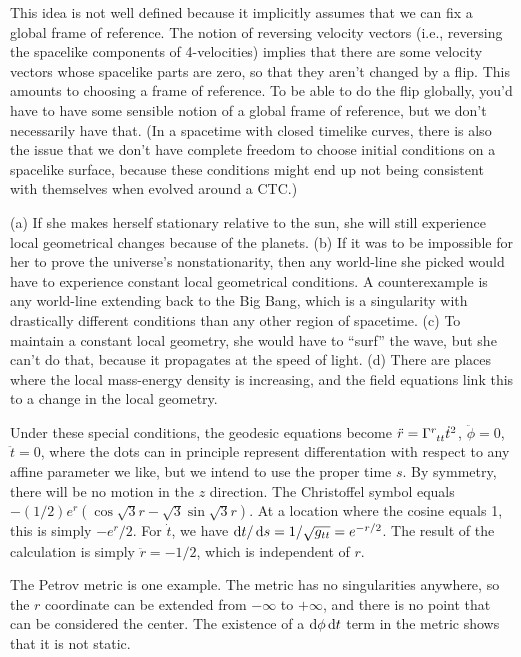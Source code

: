 This idea is not well defined because it implicitly assumes that we can fix a global
frame of reference. The notion of reversing velocity
vectors (i.e., reversing the spacelike components of 4-velocities) implies
that there are some velocity vectors whose spacelike parts are zero, so that
they aren't changed by a flip. This amounts to choosing a frame of reference. To
be able to do the flip globally, you'd have to have some sensible notion of
a global frame of reference, but we don't necessarily have that. (In a spacetime with closed timelike
curves, there is also the issue that we don't have complete freedom to choose initial
conditions on a spacelike surface, because these conditions might end up not being
consistent with themselves when evolved around a CTC.)


(a) If she makes herself stationary relative to the sun, she will still experience local geometrical changes
because of the planets. (b) If it was to be impossible for her to prove the universe's nonstationarity,
then any world-line she picked would have to experience constant local geometrical conditions.
A counterexample is any world-line extending back to the Big Bang, which is a singularity with drastically
different conditions than any other region of spacetime.
(c) To maintain a constant local geometry, she would have to ``surf'' the wave, but
she can't do that, because it propagates at the speed of light. (d) There are places where the
local mass-energy density is increasing, and the field equations link this to a change in the local
geometry.


Under these special conditions, the geodesic equations become $\ddot{r}=\Gamma\indices{^r_{tt}}\dot{t}^2$,
$\ddot{\phi}=0$, $\ddot{t}=0$,
where the dots can in principle represent differentation with respect to any affine parameter we like, but
we intend to use the proper time $s$.
By symmetry, there will be no motion in the $z$ direction.
The Christoffel symbol equals $-(1/2)e^r(\cos\sqrt{3}r-\sqrt{3}\sin\sqrt{3}r)$. At a location where
the cosine equals 1, this is simply $-e^r/2$. For $\dot{t}$, we have $\operatorname{d\!} t/\operatorname{d\!} s=1/\sqrt{g_{tt}}=e^{-r/2}$.
The result of the calculation is simply $\ddot{r}=-1/2$, which is independent of $r$.


The Petrov metric is one example. The metric has no singularities anywhere, so the $r$ coordinate
can be extended from $-\infty$ to $+\infty$, and there is no point that can be considered the center.
The existence of a $\operatorname{d\!}\phi \operatorname{d\!} t$ term in the metric shows that it is not static.


